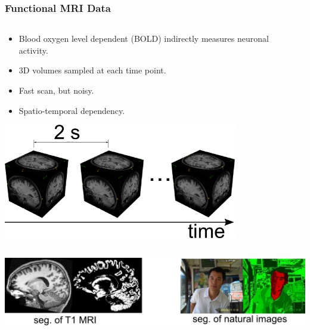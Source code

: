 \documentclass[sansserif, 10pt]{beamer}
\begin{document}
\begin{frame}
  \frametitle{Functional MRI Data }
  \begin{columns}[c]
    \begin{column}{5cm}

      \begin{block}{}
        \begin{itemize}
        \item Blood oxygen level dependent (BOLD) indirectly measures neuronal
          activity.
        \item 3D volumes sampled at each time point.
        \item Fast scan, but noisy.
        \item Spatio-temporal dependency.
        \end{itemize}
      \end{block}
      \includegraphics[width=0.8\textwidth]{sfig/4dfmri}
    \end{column}

    \begin{column}{5cm}

    \end{column}
  \end{columns}
  \centering
  \includegraphics[height=0.2\textheight]{sfig/easy_seg}    

\end{frame}
\end{document}

